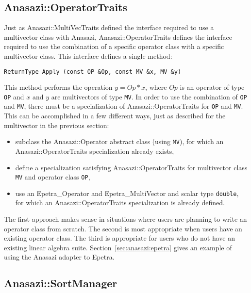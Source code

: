 \subsection{Anasazi::OperatorTraits}
\label{sec:anasazi:opt}

Just as Anasazi::MultiVecTraits defined the interface required to use a
multivector class with Anasazi, Anasazi::OperatorTraits defines the
interface required to use the combination of a specific operator class with a
specific multivector class. This interface defines a single method:
\begin{verbatim}
ReturnType Apply (const OP &Op, const MV &x, MV &y)
\end{verbatim}
This method performs the operation $y = Op*x$, where $Op$ is an operator of type
\verb!OP! and $x$ and $y$ are multivectors of type \verb!MV!. In order to use the
combination of \verb!OP! and \verb!MV!, there must be a specialization of
Anasazi::OperatorTraits for \verb!OP! and \verb!MV!. This can be
accomplished in a few different ways, just as described for the multivector in
the previous section:
\begin{itemize}
\item subclass the Anasazi::Operator abstract class (using
\verb!MV!), for which an Anasazi::OperatorTraits specialization already exists,
\item define a specialization satisfying Anasazi::OperatorTraits for multivector
class \verb!MV! and operator class \verb!OP!,
\item use an Epetra\_Operator and Epetra\_MultiVector and scalar
type \verb!double!, for which an Anasazi::OperatorTraits specialization is already
defined.
\end{itemize}

The first approach makes sense in situations where users are planning to write
an operator class from scratch. The second is most appropriate when users have
an existing operator class. The third is appropriate for users who do not have
an existing linear algebra suite. Section~\ref{sec:anasazi:epetra} gives an
example of using the Anasazi adapter to Epetra.

\subsection{Anasazi::SortManager}
\label{sec:anasazi:sm}

